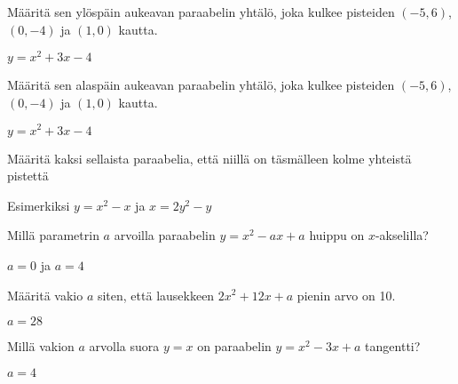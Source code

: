 \begin{tehtavasivu}
\begin{tehtava}
Määritä sen ylöspäin aukeavan paraabelin yhtälö, joka kulkee pisteiden $(-5, 6)$, $(0, -4)$ ja $(1, 0)$ kautta.
\begin{vastaus}
$y= x^2+3x-4$
\end{vastaus}
\end{tehtava}

\begin{tehtava}
Määritä sen alaspäin aukeavan paraabelin yhtälö, joka kulkee pisteiden $(-5, 6)$, $(0, -4)$ ja $(1, 0)$ kautta.
\begin{vastaus}
$y= x^2+3x-4$
\end{vastaus}
\end{tehtava}

\begin{tehtava}
Määritä kaksi sellaista paraabelia, että niillä on täsmälleen kolme yhteistä pistettä
\begin{vastaus}
Esimerkiksi $y=x^2-x$ ja  $x=2y^2-y$
\end{vastaus}
\end{tehtava}

\begin{tehtava}
Millä parametrin $a$ arvoilla paraabelin $y=x^2-ax+a$ huippu on $x$-akselilla?
\begin{vastaus}
$a=0$ ja $a=4$
\end{vastaus}
\end{tehtava}

\begin{tehtava}
Määritä vakio $a$ siten, että lausekkeen $2x^2+12x+a$ pienin arvo on 10.
\begin{vastaus}
$a=28$
\end{vastaus}
\end{tehtava}

\begin{tehtava}
Millä vakion $a$ arvolla suora $y=x$ on paraabelin $y=x^2-3x+a$ tangentti?
\begin{vastaus}
$a=4$
\end{vastaus}
\end{tehtava}


\end{tehtavasivu}
